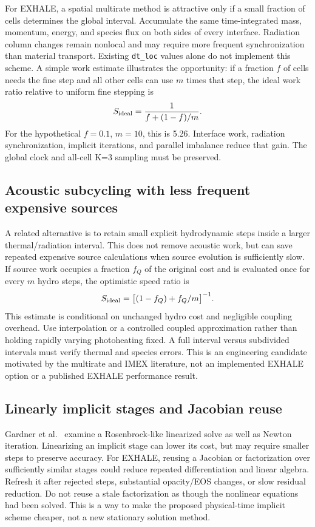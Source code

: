 \documentclass[english,a4paper]{my_memo}
\newcommand{\code}[1]{\nolinkurl{#1}}
\begin{document}
For EXHALE, a spatial multirate method is attractive only if a small fraction of cells determines the global interval. Accumulate the same time-integrated mass, momentum, energy, and species flux on both sides of every interface. Radiation column changes remain nonlocal and may require more frequent synchronization than material transport. Existing \code{dt_loc} values alone do not implement this scheme. A simple work estimate illustrates the opportunity: if a fraction $f$ of cells needs the fine step and all other cells can use $m$ times that step, the ideal work ratio relative to uniform fine stepping is
\begin{equation}
 S_{\rm ideal}=\frac{1}{f+(1-f)/m}.
\end{equation}
For the hypothetical $f=0.1$, $m=10$, this is 5.26. Interface work, radiation synchronization, implicit iterations, and parallel imbalance reduce that gain. The global clock and all-cell K=3 sampling must be preserved.

\subsection{Acoustic subcycling with less frequent expensive sources}
A related alternative is to retain small explicit hydrodynamic steps inside a larger thermal/radiation interval. This does not remove acoustic work, but can save repeated expensive source calculations when source evolution is sufficiently slow. If source work occupies a fraction $f_Q$ of the original cost and is evaluated once for every $m$ hydro steps, the optimistic speed ratio is
\begin{equation}
 S_{\rm ideal}=\big[(1-f_Q)+f_Q/m\big]^{-1}.
\end{equation}
This estimate is conditional on unchanged hydro cost and negligible coupling overhead. Use interpolation or a controlled coupled approximation rather than holding rapidly varying photoheating fixed. A full interval versus subdivided intervals must verify thermal and species errors. This is an engineering candidate motivated by the multirate and IMEX literature, not an implemented EXHALE option or a published EXHALE performance result.

\subsection{Linearly implicit stages and Jacobian reuse}
Gardner et al.\ \cite{gardner} examine a Rosenbrock-like linearized solve as well as Newton iteration. Linearizing an implicit stage can lower its cost, but may require smaller steps to preserve accuracy. For EXHALE, reusing a Jacobian or factorization over sufficiently similar stages could reduce repeated differentiation and linear algebra. Refresh it after rejected steps, substantial opacity/EOS changes, or slow residual reduction. Do not reuse a stale factorization as though the nonlinear equations had been solved. This is a way to make the proposed physical-time implicit scheme cheaper, not a new stationary solution method.
\end{document}
